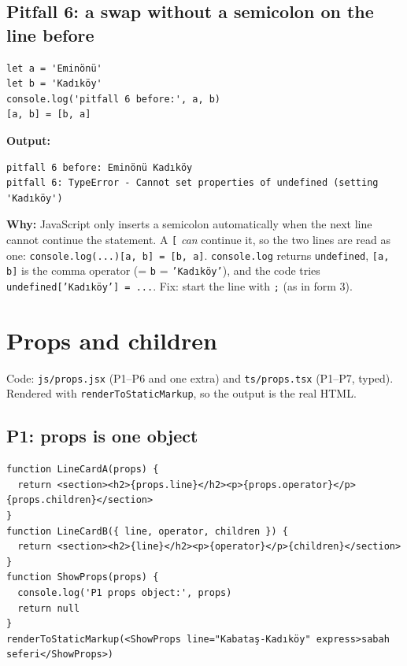 \documentclass[
  10pt,
]{article}
\begin{document}
\hypertarget{pitfall-6-a-swap-without-a-semicolon-on-the-line-before}{%
\subsection{Pitfall 6: a swap without a semicolon on the line
before}\label{pitfall-6-a-swap-without-a-semicolon-on-the-line-before}}

\begin{verbatim}
let a = 'Eminönü'
let b = 'Kadıköy'
console.log('pitfall 6 before:', a, b)
[a, b] = [b, a]
\end{verbatim}

\textbf{Output:}

\begin{verbatim}
pitfall 6 before: Eminönü Kadıköy
pitfall 6: TypeError - Cannot set properties of undefined (setting 'Kadıköy')
\end{verbatim}

\textbf{Why:} JavaScript only inserts a semicolon automatically when the
next line cannot continue the statement. A \texttt{[\allowbreak{}}
\emph{can} continue it, so the two lines are read as one:
\texttt{console.\allowbreak{}log(\allowbreak{}.\allowbreak{}.\allowbreak{}.\allowbreak{})[\allowbreak{}a,\allowbreak{} b] =\allowbreak{} [\allowbreak{}b,\allowbreak{} a]}.
\texttt{console.\allowbreak{}log} returns \texttt{undefined},
\texttt{[\allowbreak{}a,\allowbreak{} b]} is the comma operator (=
\texttt{b} = \texttt{'Kadıköy'}), and the code tries
\texttt{undefined[\allowbreak{}'Kadıköy'] =\allowbreak{} .\allowbreak{}.\allowbreak{}.\allowbreak{}}.
Fix: start the line with \texttt{;} (as in form 3).

\hypertarget{props-and-children}{%
\section{Props and children}\label{props-and-children}}

Code: \texttt{js/\allowbreak{}props.\allowbreak{}jsx} (P1--P6 and one
extra) and \texttt{ts/\allowbreak{}props.\allowbreak{}tsx} (P1--P7,
typed). Rendered with \texttt{renderToStaticMarkup}, so the output is
the real HTML.

\hypertarget{p1-props-is-one-object}{%
\subsection{P1: props is one object}\label{p1-props-is-one-object}}

\begin{verbatim}
function LineCardA(props) {
  return <section><h2>{props.line}</h2><p>{props.operator}</p>{props.children}</section>
}
function LineCardB({ line, operator, children }) {
  return <section><h2>{line}</h2><p>{operator}</p>{children}</section>
}
function ShowProps(props) {
  console.log('P1 props object:', props)
  return null
}
renderToStaticMarkup(<ShowProps line="Kabataş-Kadıköy" express>sabah seferi</ShowProps>)
\end{verbatim}
\end{document}
